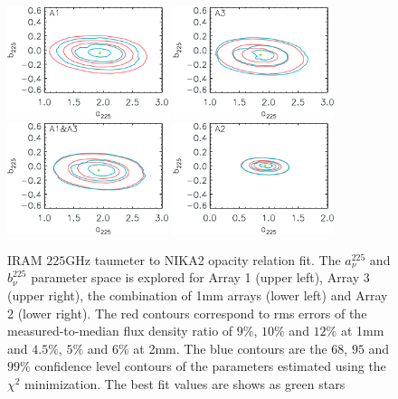 \begin{figure}[ht!]
  \begin{center}
    \includegraphics[clip=true, trim={0, -0.3cm, -0.3cm, 0}, width=0.42\textwidth]{Figures/Opacity/fit_nika2_tau_from_taumeter_mwc349_a1.pdf}
    \includegraphics[clip=true, trim={0, -0.3cm, -0.3cm, 0}, width=0.42\textwidth]{Figures/Opacity/fit_nika2_tau_from_taumeter_mwc349_a3.pdf}
    \includegraphics[clip=true, trim={0, -0.3cm, -0.3cm, 0}, width=0.42\textwidth]{Figures/Opacity/fit_nika2_tau_from_taumeter_mwc349_1mm.pdf}
    \includegraphics[clip=true, trim={0, -0.3cm, -0.3cm, 0}, width=0.42\textwidth]{Figures/Opacity/fit_nika2_tau_from_taumeter_mwc349_a2.pdf}
    \caption[IRAM taumeter to NIKA2 opacity model]{IRAM $225$GHz taumeter to
    NIKA2 opacity relation fit.
    The $a_{\nu}^{225}$ and
    $b_{\nu}^{225}$ parameter space is explored for Array 1 (upper left),
    Array 3 (upper right), the combination of 1mm arrays (lower left)
    and Array 2 (lower right).
    The red contours correspond to rms
    errors of the measured-to-median flux density ratio of $9\%$, $10\%$
    and $12\%$ at 1mm and $4.5\%$, $5\%$ and $6\%$ at 2mm. The blue
    contours are the $68$, $95$ and $99\%$ confidence
    level contours of the parameters estimated using the $\chi^2$
    minimization.
    The best fit values are shows as green stars} 
\label{fig:taumeter_fit}
\end{center}
\end{figure}



